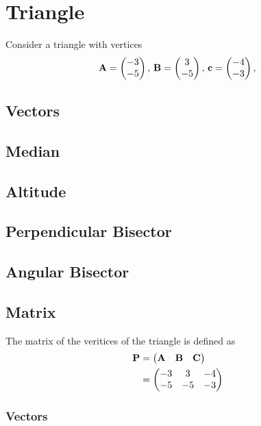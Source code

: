 \documentclass[11pt]{book}
\begin{document}
\frontmatter
\tableofcontents
\setcounter{page}{1}
\mainmatter
\chapter{Triangle}
Consider a triangle with vertices
\begin{align}
\label{eq:tri-pts}
\vec{A}=\myvec{-3 \\ -5},\,
\vec{B}=\myvec{3\\-5},\,
	\vec{c}=\myvec{-4\\-3},\,
\end{align}

\section{Vectors}
\section{Median}
\section{Altitude}
\section{Perpendicular Bisector}
\section{Angular Bisector}
\section{Matrix}

The matrix of the veritices of the triangle is defined as
		\begin{align}
			\mathbf{P} &= \begin{pmatrix}\mathbf{A} & \mathbf{B} &\mathbf{C}\end{pmatrix} \\
            &=\begin{pmatrix}-3 & 3 & -4 \\ -5 & -5 & -3\end{pmatrix}
		\end{align}

\subsection{Vectors}
\end{document}
